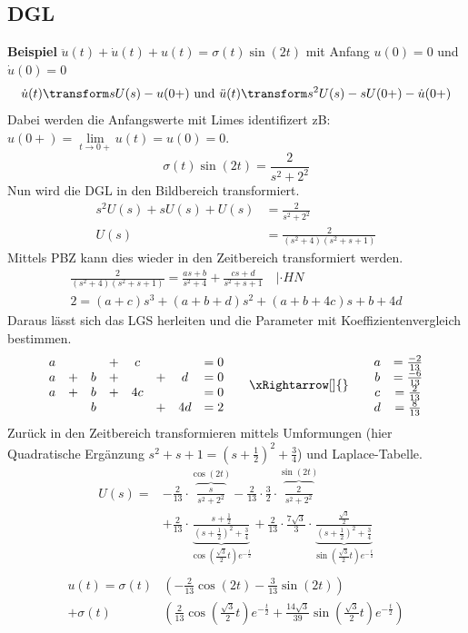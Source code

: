 \subsection{DGL}
\textbf{Beispiel} $\ddot{u}(t) + \dot{u}(t) + u(t) = \sigma(t)\sin(2t)$ mit Anfang $u(0) = 0$ und $\dot{u}(0) = 0$
\[\dot{u}(t) \transform sU(s) - u(0+) \text{ und } \ddot{u}(t) \transform s^2U(s) - sU(0+) - \dot{u}(0+)\]
Dabei werden die Anfangswerte mit Limes identifizert zB: $u(0+) = \lim\limits_{t\rightarrow0+}u(t) = u(0) = 0$.
\[ \sigma(t)\sin(2t) = \frac{2}{s^2 + 2^2} \]
Nun wird die DGL in den Bildbereich transformiert.
\begin{align*}
	s^2U(s) + sU(s) + U(s) &= \frac{2}{s^2 + 2^2} \\
	U(s) &= \frac{2}{(s^2 + 4)(s^2 + s + 1)}
\end{align*}
Mittels PBZ kann dies wieder in den Zeitbereich transformiert werden.
\begin{align*}
	\frac{2}{(s^2 + 4)(s^2 + s + 1)} = \frac{as +b}{s^2 + 4}+\frac{cs + d}{s^2 + s + 1} \quad | \cdot HN \\
	2 = (a + c)s^3 + (a+b+d)s^2 + (a+b+4c)s + b + 4d
\end{align*}
Daraus lässt sich das LGS herleiten und die Parameter mit Koeffizientenvergleich bestimmen.
\[
\begin{matrix}
	a &  &   & + & c  &    &     & = 0 \\
	a &+ & b & + &    & +  & d   &= 0 \\
	a &+ & b & + & 4c &    &     & = 0 \\
	  &  & b &   &    & +  & 4d  & = 2\\
\end{matrix} \qquad\xRightarrow[]{}\qquad
\begin{matrix}
	a &= \frac{-2}{13} \\
	b &=\frac{-6}{13} \\
	c &=\frac{2}{13} \\
	d &= \frac{8}{13}\\
\end{matrix}
\]
Zurück in den Zeitbereich transformieren mittels Umformungen (hier Quadratische Ergänzung $s^2 + s +1 = (s+\frac{1}{2})^2 + \frac{3}{4}$) und Laplace-Tabelle.
\begin{align*}
	U(s) =& -\frac{2}{13}\cdot\overbrace{\frac{s}{s^2 +2^2}}^{\cos(2t)} -\frac{2}{13}\cdot\frac{3}{2}\cdot\overbrace{\frac{2}{s^2 + 2^2}}^{\sin(2t)} \\
	     & + \frac{2}{13}\cdot\underbrace{\frac{s + \frac{1}{2}}{(s+\frac{1}{2})^2 + \frac{3}{4}}}_{\cos\left(\frac{\sqrt{3}}{2}t\right)e^{-\frac{t}{2}}} + \frac{2}{13}\cdot\frac{7\sqrt{3}}{3}\cdot\underbrace{\frac{\frac{\sqrt{3}}{2}}{(s+\frac{1}{2})^2 + \frac{3}{4}}}_{\sin\left(\frac{\sqrt{3}}{2}t\right)e^{-\frac{t}{2}}} \\
\end{align*}
\begin{align*}
	u(t) = \sigma(t)&\left(-\frac{2}{13}\cos(2t) -\frac{3}{13}\sin(2t)\right) \\
	 	   + \sigma(t)&\left( \frac{2}{13}\cos\left(\frac{\sqrt{3}}{2}t\right)e^{-\frac{t}{2}} + \frac{14\sqrt{3}}{39}\sin\left(\frac{\sqrt{3}}{2}t\right)e^{-\frac{t}{2}}\right)
\end{align*}

